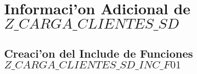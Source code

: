 \chapter{Informaci'on Adicional de $Z\_CARGA\_CLIENTES\_SD$}
\section{Creaci'on del Include de Funciones $Z\_CARGA\_CLIENTES\_SD\_INC\_F01$}

